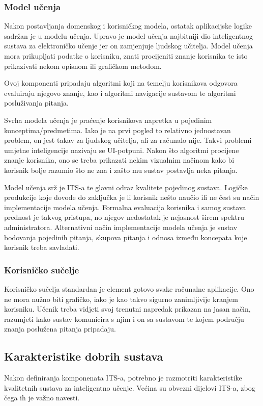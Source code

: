 \documentclass[times, utf8, zavrsni, numeric]{fer}
\begin{document}
\subsubsection{Model učenja}
Nakon postavljanja domenskog i korisničkog modela, ostatak aplikacijske logike sadržan je u modelu učenja. Upravo je model učenja najbitniji dio inteligentnog sustava za elektroničko učenje jer on zamjenjuje ljudskog učitelja. Model učenja mora prikupljati podatke o korisniku, znati procijeniti znanje korisnika te isto prikazivati nekom opisnom ili grafičkom metodom.\citep{markurban}
\par
Ovoj komponenti pripadaju algoritmi koji na temelju korisnikova odgovora evaluiraju njegovo znanje, kao i algoritmi navigacije sustavom te algoritmi posluživanja pitanja.
\par
Svrha modela učenja je praćenje korisnikova napretka u pojedinim konceptima/predmetima. Iako je na prvi pogled to relativno jednostavan problem, on jest takav za ljudskog učitelja, ali za računalo nije. Takvi problemi umjetne inteligencije nazivaju se UI-potpuni. Nakon što algoritmi procijene znanje korisnika, ono se treba prikazati nekim vizualnim načinom kako bi korisnik bolje razumio što ne zna i zašto mu sustav postavlja neka pitanja.
\par
Model učenja srž je ITS-a te glavni odraz kvalitete pojedinog sustava. Logičke produkcije koje dovode do zaključka je li korisnik nešto naučio ili ne čest su način implementacije modela učenja.\citep{zhenzhai} Formalna evaluacija korisnika i samog sustava prednost je takvog pristupa, no njegov nedostatak je nejasnost širem spektru administratora. Alternativni način implementacije modela učenja je sustav bodovanja pojedinih pitanja, skupova pitanja i odnosa između koncepata koje korisnik treba savladati.

\subsubsection{Korisničko sučelje}
Korisničko sučelja standardan je element gotovo svake računalne aplikacije. Ono ne mora nužno biti grafičko, iako je kao takvo sigurno zanimljivije kranjem korisniku. Učenik treba vidjeti svoj trenutni napredak prikazan na jasan način, razumjeti kako sustav komunicira s njim i on sa sustavom te kojem području znanja poslužena pitanja pripadaju.

\subsection{Karakteristike dobrih sustava}
Nakon definiranja komponenata ITS-a, potrebno je razmotriti karakteristike kvalitetnih sustava za inteligentno učenje. Većina su obvezni dijelovi ITS-a, zbog čega ih je važno navesti.
\end{document}
